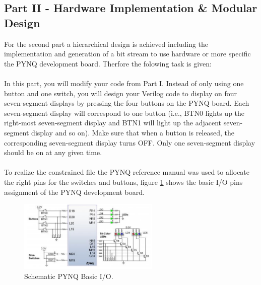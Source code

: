 \subsection{Part II - Hardware Implementation \& Modular Design}\label{sub: Hardware Implementation Modular Design}
For the second part a hierarchical design is achieved including the implementation and generation of a bit stream to use hardware or more specific the PYNQ development board. Therfore the folowing task is given:
\\
\\
In this part, you will modify your code from Part I. Instead of only using one button and one switch, you will
design your Verilog code to display on four seven-segment displays by pressing the four buttons on the PYNQ
board. Each seven-segment display will correspond to one button (i.e., BTN0 lights up the right-most seven-segment
display and BTN1 will light up the adjacent seven-segment display and so on). Make sure that when a
button is released, the corresponding seven-segment display turns OFF. Only one seven-segment display should
be on at any given time.
\\
\\
To realize the constrained file the PYNQ reference manual was used to allocate the right pins for the switches and buttons, figure \ref{fig: PYNQ_BasicIO} shows the basic I/O pins assignment of the PYNQ development board.
\begin{figure}[htbp]
	\centering
	\includegraphics[width=0.6\textwidth]{01_images/PYNQ_BasicIO.png}
	\caption{Schematic PYNQ Basic I/O. \cite{PYNG_RM}}
	\label{fig: PYNQ_BasicIO}
\end{figure}
%

